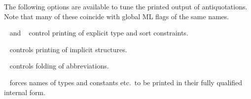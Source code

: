\begin{isabellebody}
\begin{isamarkuptext}
\begin{description}
  \end{description}%
\end{isamarkuptext}%
\isamarkuptrue%
%
\isamarkuptrue%
%
\begin{isamarkuptext}%
The following options are available to tune the printed output
  of antiquotations.  Note that many of these coincide with global ML
  flags of the same names.

  \begin{description}

  \item {}\hypertarget{antiquotation option.show-types}{\hyperlink{antiquotation option.show-types}{\mbox{}}}~ and
  \hypertarget{antiquotation option.show-sorts}{\hyperlink{antiquotation option.show-sorts}{\mbox{}}}~ control
  printing of explicit type and sort constraints.

  \item {}\hypertarget{antiquotation option.show-structs}{\hyperlink{antiquotation option.show-structs}{\mbox{}}}~
  controls printing of implicit structures.

  \item {}\hypertarget{antiquotation option.show-abbrevs}{\hyperlink{antiquotation option.show-abbrevs}{\mbox{}}}~
  controls folding of abbreviations.

  \item {}\hypertarget{antiquotation option.names-long}{\hyperlink{antiquotation option.names-long}{\mbox{}}}~ forces
  names of types and constants etc.\ to be printed in their fully
  qualified internal form.


\end{description}
\end{isamarkuptext}
\end{isabellebody}
